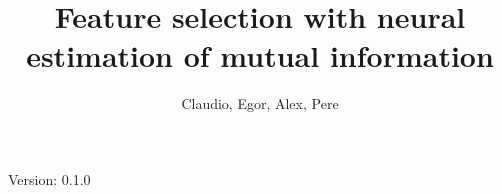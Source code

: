 \documentclass{mypaper}
\author{
Claudio,
Egor,
Alex,
Pere
}
\title{Feature selection with neural estimation of mutual information}
\begin{document}
\maketitle

Version: 0.1.0






\end{document}
